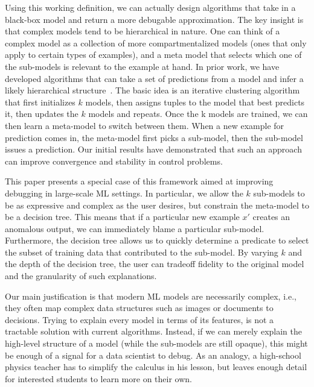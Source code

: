 Using this working definition, we can actually design algorithms that take in a black-box model and return a more debugable approximation.
The key insight is that complex models tend to be hierarchical in nature.
One can think of a complex model as a collection of more compartmentalized models (ones that only apply to certain types of examples), and a meta model that selects which one of the sub-models is relevant to the example at hand.
In prior work, we have developed algorithms that can take a set of predictions from a model and infer a likely hierarchical structure~\cite{DBLP:journals/corr/KrishnanGLMPG16, Krishnan17}.
The basic idea is an iterative clustering algorithm that first initializes $k$ models, then assigns tuples to the model that best predicts it, then updates the $k$ models and repeats.
Once the k models are trained, we can then learn a meta-model to switch between them.
When a new example for prediction comes in, the meta-model first picks a sub-model, then the sub-model issues a prediction.
Our initial results have demonstrated that such an approach can improve convergence and stability in control problems.

This paper presents a special case of this framework aimed at improving debugging in large-scale ML settings. 
In particular, we allow the $k$ sub-models to be as expressive and complex as the user desires, but constrain the meta-model to be a decision tree.
This means that if a particular new example $x'$ creates an anomalous output, we can immediately blame a particular sub-model.
Furthermore, the decision tree allows us to quickly determine a predicate to select the subset of training data that contributed to the sub-model.
By varying $k$ and the depth of the decision tree, the user can tradeoff fidelity to the original model and the granularity of such explanations.


Our main justification is that modern ML models are necessarily complex, i.e., they often map complex data structures such as images or documents to decisions. Trying to explain every model in terms of its features, is not a tractable solution with current algorithms. Instead, if we can merely explain the high-level structure of a model (while the sub-models are still opaque), this might be enough of a signal for a data scientist to debug. As an analogy, a high-school physics teacher has to simplify the calculus in his lesson, but leaves enough detail for interested students to learn more on their own.




























